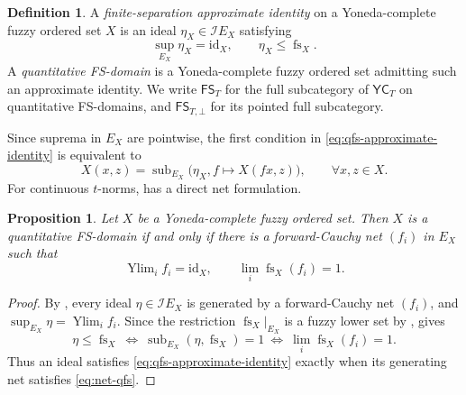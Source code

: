 \documentclass[preprint,3p,times]{elsarticle}
\newtheorem{proposition}[proposition]{Proposition}
\theoremstyle{definition}
\newtheorem{definition}[definition]{Definition}
\theoremstyle{remark}
\newcommand{\I}{\mathcal{I}}
\newcommand{\FS}{\mathsf{FS}}
\newcommand{\YC}{\mathsf{YC}}
\newcommand{\id}{\mathrm{id}}
\newcommand{\supop}{\operatorname{sup}}
\newcommand{\fs}{\operatorname{fs}}
\newcommand{\Ylim}{\operatorname{Ylim}}
\newcommand{\subdeg}{\operatorname{sub}}
\numberwithin{equation}{section}
\begin{document}
\begin{definition}\label{def:qfs}
A \emph{finite-separation approximate identity} on a Yoneda-complete fuzzy ordered set \(X\) is an ideal \(\eta_X\in\I E_X\) satisfying
\begin{equation}\label{eq:qfs-approximate-identity}
  \supop_{E_X}\eta_X=\id_X,
  \qquad
  \eta_X\leq\fs_X.
\end{equation}
A \emph{quantitative FS-domain} is a Yoneda-complete fuzzy ordered set admitting such an approximate identity. We write \(\FS_T\) for the full subcategory of \(\YC_T\) on quantitative FS-domains, and \(\FS_{T,\bot}\) for its pointed full subcategory. 
\end{definition}

Since suprema in \(E_X\) are pointwise, the first condition in \eqref{eq:qfs-approximate-identity} is equivalent to
\begin{equation}\label{eq:identity-colimit-pointwise}
  X(x,z)=\subdeg_{E_X}\bigl(\eta_X,f\mapsto X(fx,z)\bigr)
  ,\qquad \forall x,z\in X.
\end{equation}
For continuous \(t\)-norms,  has a direct net formulation.

\begin{proposition}\label{prop:net-qfs}
Let \(X\) be a Yoneda-complete fuzzy ordered set. Then \(X\) is a quantitative FS-domain if and only if there is a forward-Cauchy net \((f_i)\) in \(E_X\) such that
\begin{equation}\label{eq:net-qfs}
  \Ylim_i f_i=\id_X,
  \qquad
  \lim_i\fs_X(f_i)=1.
\end{equation}
\end{proposition}

\begin{proof}
By , every ideal
\(\eta\in\I E_X\) is generated by a forward-Cauchy net \((f_i)\), and
\(\supop_{E_X}\eta=\Ylim_i f_i\).
Since the restriction \(\fs_X|_{E_X}\) is a fuzzy lower set by ,
 gives
\[
 \eta\leq\fs_X
 \ \Longleftrightarrow\
 \subdeg_{E_X}(\eta,\fs_X)=1
 \ \Longleftrightarrow\
 \lim_i\fs_X(f_i)=1.
\]
Thus an ideal satisfies \eqref{eq:qfs-approximate-identity} exactly when
its generating net satisfies \eqref{eq:net-qfs}.
\end{proof}
\end{document}
